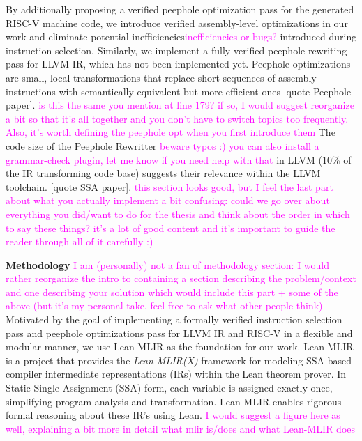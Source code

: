 By additionally proposing a verified peephole optimization pass for the generated RISC-V machine code,  
we introduce verified assembly-level optimizations in our work and eliminate potential inefficiencies\textcolor{magenta}{inefficiencies or bugs?} 
introduced during instruction selection. 
Similarly, we implement a fully verified peephole rewriting pass for LLVM-IR, which has not been implemented yet. 
Peephole optimizations are small, local transformations that replace short sequences of assembly instructions with 
semantically equivalent but more efficient ones [quote Peephole paper]. \textcolor{magenta}{is this the same you mention
at line 179? if so, I would suggest reorganize a bit so that it's all together and you don't have to switch topics too frequently. 
Also, it's worth defining the peephole opt when you first introduce them}
The code size of the Peephole Rewritter
\textcolor{magenta}{beware typos :) you can also install a grammar-check plugin, let me know if you need help with that} 
in LLVM (10\% of the IR transforming code base) suggests their relevance within the LLVM toolchain. [quote SSA paper].
\textcolor{magenta}{this section looks good, but I feel the last part about what you actually implement a bit confusing: 
could we go over about everything you did/want to do for the thesis and think about the order in which to say these things?
it's a lot of good content and it's important to guide the reader through all of it carefully :)}

\textbf{Methodology}
\textcolor{magenta}{I am (personally) not a fan of methodology section: I would rather reorganize the intro 
to containing a section describing the problem/context and one describing your solution which would include 
this part + some of the above (but it's my personal take, feel free to ask what other people think)}
Motivated by the goal of implementing a formally verified instruction selection pass and peephole optimizations pass for 
LLVM IR and RISC-V in a flexible and modular manner, we use Lean-MLIR as the foundation for our work.
Lean-MLIR is a project that provides the  \textit{Lean-MLIR(X)}  framework for modeling SSA-based compiler 
intermediate representations (IRs) within the Lean theorem prover. 
In Static Single Assignment (SSA) form, each variable is assigned exactly once, simplifying program analysis and transformation. 
Lean-MLIR enables rigorous formal reasoning about these IR's using Lean.
\textcolor{magenta}{I would suggest a figure here as well, explaining a bit more in detail what mlir is/does 
and what Lean-MLIR does}

